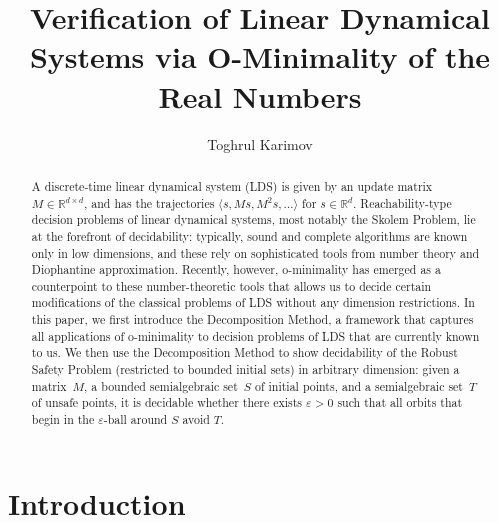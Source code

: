 \documentclass[a4paper,UKenglish,cleveref]{lipics-v2021}
\title{Verification of Linear Dynamical Systems via O-Minimality of the Real Numbers}
\author {Toghrul Karimov} 
{Max Planck Institute for Software Systems, Saarland Informatics Campus, Saarbr\"ucken, Germany}
{toghs@mpi-sws.org}
{https://orcid.org/0000-0002-9405-2332}
{}
\newcommand{\rel}{\mathbb{R}}
\begin{document}
\maketitle

\begin{abstract}
	A discrete-time linear dynamical system (LDS) is given by an update matrix $M \in \rel^{d\times d}$, and has the trajectories $\langle s, Ms, M^2s, \ldots \rangle$ for $s \in \rel^d$.
	Reachability-type decision problems of linear dynamical systems, most notably the Skolem Problem, lie at the forefront of decidability: typically, sound and complete algorithms are known only in low dimensions, and these rely on sophisticated tools from number theory and Diophantine approximation.
	Recently, however, o-minimality has emerged as a counterpoint to these number-theoretic tools that allows us to decide certain modifications of the classical problems of LDS without any dimension restrictions.
In this paper, we first introduce the Decomposition Method, a framework that captures all applications of o-minimality to decision problems of LDS that are currently known to us.
	We then use the Decomposition Method to show decidability of the Robust Safety Problem (restricted to bounded initial sets) in arbitrary dimension:
	given a matrix~$M$, a bounded semialgebraic set~$S$ of initial points, and a semialgebraic set~$T$ of unsafe points, it is decidable whether there exists $\varepsilon > 0$ such that all orbits that begin in the $\varepsilon$-ball around $S$ avoid $T$.
\end{abstract}

\section{Introduction}
\end{document}
